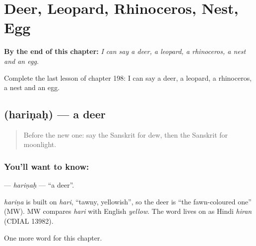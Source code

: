 
\chapter{Deer, Leopard, Rhinoceros, Nest, Egg}
\label{ch:sa-deer-leopard-rhinoceros-nest-egg}

\begin{chapteropening}
\textbf{By the end of this chapter:} \emph{I can say a deer, a leopard, a rhinoceros, a nest and an egg.}

Complete the last lesson of chapter 198: I can say a deer, a leopard, a rhinoceros, a nest and an egg.
\end{chapteropening}

\section[\texorpdfstring{\sk{हरिणः} (hariṇaḥ)}{हरिणः (hariṇaḥ)}]{ (hariṇaḥ) — a deer}

\label{lesson:SA-C198-harinah}



\begin{quote}
Before the new one: say the Sanskrit for dew, then the Sanskrit for moonlight.
\end{quote}

\subsection*{You'll want to know: }
\textbf{} — \emph{hariṇaḥ} — \textquotedblleft{}a deer\textquotedblright{}.

\begin{cousinweb}
\emph{hariṇa} is built on \emph{hari}, \textquotedblleft{}tawny, yellowish\textquotedblright{}, so the deer is \textquotedblleft{}the fawn-coloured one\textquotedblright{} (MW). MW compares \emph{hari} with English \emph{yellow}. The word lives on as Hindi \emph{hiran} (CDIAL 13982).
\end{cousinweb}

\begin{grammarlens}[title={What you've built}]
One more word for this chapter.
\end{grammarlens}

